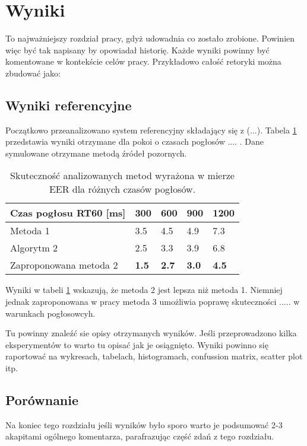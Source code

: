 \section{Wyniki}

To najważniejszy rozdział pracy, gdyż udowadnia co zostało zrobione. Powinien więc być tak napisany by opowiadał historię. Każde wyniki powinny być komentowane w kontekście celów pracy. Przykładowo całość retoryki można zbudować jako:

\subsection{Wyniki referencyjne}

Początkowo przeanalizowano system referencyjny składający się z (...). Tabela \ref{tab:wyniki1} przedstawia wyniki otrzymane dla pokoi o czasach pogłosów .... . Dane symulowane otrzymane metodą źródeł pozornych.

\begin{table}[h]
\centering
\caption{Skuteczność analizowanych metod wyrażona w mierze EER dla różnych czasów pogłosów.}
\begin{tabular}{@{}lllll@{}}
\toprule
Czas pogłosu RT60 {[}ms{]}      & 300          & 600          & 900          & 1200         \\ \midrule
Metoda 1                        & 3.5          & 4.5          & 4.9          & 7.3          \\
Algorytm 2                      & 2.5          & 3.3          & 3.9          & 6.8          \\
Zaproponowana metoda 2 & \textbf{1.5} & \textbf{2.7} & \textbf{3.0} & \textbf{4.5} \\ \bottomrule
\end{tabular}
\label{tab:wyniki1}
\end{table}

Wyniki w tabeli \ref{tab:wyniki1} wskazują, że metoda 2 jest lepsza niż metoda 1. Niemniej jednak zaproponowana w pracy metoda 3 umożliwia poprawę skuteczności ..... w warunkach pogłosowcyh.


Tu powinny znaleźć sie opisy otrzymanych wyników. Jeśli przeprowadzono kilka eksperymentów to warto tu opisać jak je osiągnięto. Wyniki powinno się raportować na wykresach, tabelach, histogramach, confussion matrix, scatter plot itp. 

\subsection{Porównanie}
Na koniec tego rozdziału jeśli wyników było sporo warto je podsumować 2-3 akapitami ogólnego komentarza, parafrazując część zdań z tego rozdziału.